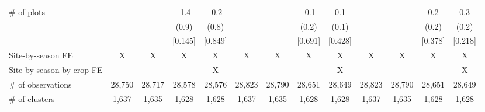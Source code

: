 \begin{tabular}{lcccccccccccc}
\# of plots &  &  & -1.4\hphantom{-} & -0.2\hphantom{-} &  &  & -0.1\hphantom{-} & 0.1 &  &  & 0.2 & 0.3 \\
 &  &  & (0.9) & (0.8) &  &  & (0.2) & (0.1) &  &  & (0.2) & (0.2) \\
 &  &  & [0.145] & [0.849] &  &  & [0.691] & [0.428] &  &  & [0.378] & [0.218] \\
\hline
Site-by-season FE & X & X & X & X & X & X & X & X & X & X & X & X \\
Site-by-season-by-crop FE &  &  &  & X &  &  &  & X &  &  &  & X \\
\# of observations & 28,750 & 28,717 & 28,578 & 28,576 & 28,823 & 28,790 & 28,651 & 28,649 & 28,823 & 28,790 & 28,651 & 28,649 \\
\# of clusters & 1,637 & 1,635 & 1,628 & 1,628 & 1,637 & 1,635 & 1,628 & 1,628 & 1,637 & 1,635 & 1,628 & 1,628 \\
\hline
\end{tabular}
